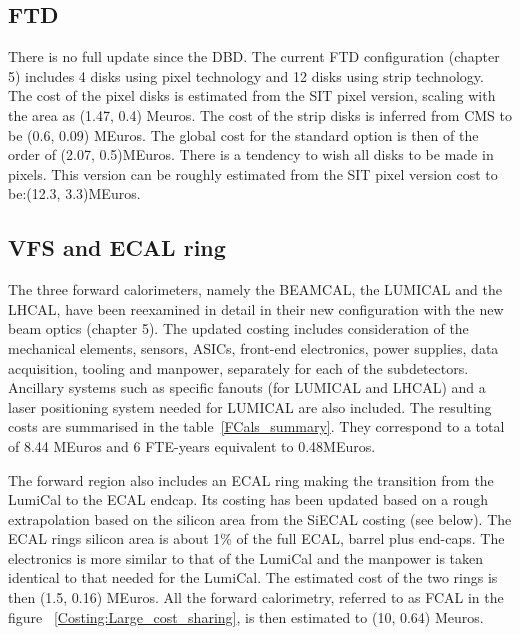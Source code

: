 \subsection{FTD}
There is no full update since the DBD. The current FTD configuration (chapter 5) includes 4 disks using pixel technology and 12 disks using strip technology. The cost of the pixel disks is estimated from the SIT pixel version, scaling with the area as (1.47, 0.4) Meuros. The cost of the strip disks is inferred from CMS to be (0.6, 0.09) MEuros. The global cost for the standard option is then of the order of (2.07, 0.5)MEuros. There is a tendency to  wish all disks to be made in pixels. This version can be roughly estimated from the SIT pixel version cost to be:(12.3, 3.3)MEuros.


\subsection{VFS and ECAL ring}

The three forward calorimeters, namely the BEAMCAL, the LUMICAL and the LHCAL, have been reexamined in detail in their new configuration with the new beam optics (chapter 5). The updated costing includes consideration of the mechanical elements, sensors, ASICs, front-end electronics, power supplies, data acquisition, tooling and manpower, separately for each of the subdetectors. Ancillary systems such as specific fanouts (for LUMICAL and LHCAL) and a laser positioning system needed for LUMICAL are also included. The resulting costs are summarised in the table~\ref{FCals_summary}. They correspond to a total of 8.44 MEuros and 6 FTE-years equivalent to 0.48MEuros.


The forward region also includes an ECAL ring making the transition from the LumiCal to the ECAL endcap. Its costing has been updated based on a rough extrapolation based on the silicon area from the SiECAL costing (see below). The ECAL rings silicon area is about  1\% of the full ECAL, barrel plus end-caps. The electronics is more similar to that of the LumiCal and the manpower is taken identical to that needed for the LumiCal.  The estimated cost of the two rings is then (1.5, 0.16) MEuros.  All the forward calorimetry, referred to as FCAL in the figure ~\ref{Costing:Large_cost_sharing}, is then estimated to (10, 0.64) Meuros.

